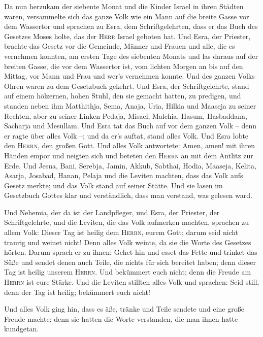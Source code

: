  Da nun herzukam der siebente Monat und die Kinder Israel
in ihren Städten waren, versammelte sich das ganze Volk wie ein Mann auf
die breite Gasse vor dem Wassertor und sprachen zu Esra, dem
Schriftgelehrten, dass er das Buch des Gesetzes Moses holte, das der
\textsc{Herr} Israel geboten hat.  Und Esra, der Priester,
brachte das Gesetz vor die Gemeinde, Männer und Frauen und alle, die es
vernehmen konnten, am ersten Tage des siebenten Monats 
und las daraus auf der breiten Gasse, die vor dem Wassertor ist, vom
lichten Morgen an bis auf den Mittag, vor Mann und Frau und wer's
vernehmen konnte. Und des ganzen Volks Ohren waren zu dem Gesetzbuch
gekehrt.  Und Esra, der Schriftgelehrte, stand auf einem
hölzernen, hohen Stuhl, den sie gemacht hatten, zu predigen, und standen
neben ihm Matthithja, Sema, Anaja, Uria, Hilkia und Maaseja zu seiner
Rechten, aber zu seiner Linken Pedaja, Misael, Malchia, Hasum,
Hasbaddana, Sacharja und Mesullam.  Und Esra tat das Buch
auf vor dem ganzen Volk -- denn er ragte über alles Volk --; und da er's
auftat, stand alles Volk.  Und Esra lobte den
\textsc{Herrn}, den großen Gott. Und alles Volk antwortete: Amen, amen!
mit ihren Händen empor und neigten sich und beteten den \textsc{Herrn}
an mit dem Antlitz zur Erde.  Und Jesua, Bani, Serebja,
Jamin, Akkub, Sabthai, Hodia, Maaseja, Kelita, Asarja, Josabad, Hanan,
Pelaja und die Leviten machten, dass das Volk aufs Gesetz merkte; und
das Volk stand auf seiner Stätte.  Und sie lasen im
Gesetzbuch Gottes klar und verständlich, dass man verstand, was gelesen
ward.

 Und Nehemia, der da ist der Landpfleger, und Esra, der
Priester, der Schriftgelehrte, und die Leviten, die das Volk aufmerken
machten, sprachen zu allem Volk: Dieser Tag ist heilig dem
\textsc{Herrn}, eurem Gott; darum seid nicht traurig und weinet nicht!
Denn alles Volk weinte, da sie die Worte des Gesetzes hörten.
 Darum sprach er zu ihnen: Gehet hin und esset das Fette
und trinket das Süße und sendet denen auch Teile, die nichts für sich
bereitet haben; denn dieser Tag ist heilig unserem \textsc{Herrn}. Und
bekümmert euch nicht; denn die Freude am \textsc{Herrn} ist eure Stärke.
 Und die Leviten stillten alles Volk und sprachen: Seid
still, denn der Tag ist heilig; bekümmert euch nicht!

 Und alles Volk ging hin, dass es äße, tränke und Teile
sendete und eine große Freude machte; denn sie hatten die Worte
verstanden, die man ihnen hatte kundgetan.


